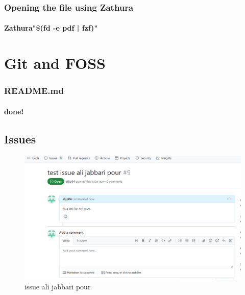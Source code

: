 \documentclass[titlepage]{article}
\begin{document}
\subsubsection{Opening the file using Zathura}
\paragraph{Zathura"\$(fd -e pdf | fzf)"}
\section{Git and FOSS}
\subsubsection{README.md}
\paragraph{done!}
\subsection{Issues}
\begin {figure}[ht]
\centering
\includegraphics[width=1/textwidth]{screne issue.png}
\caption{issue ali jabbari pour}
\end{figure}
\end{document}
